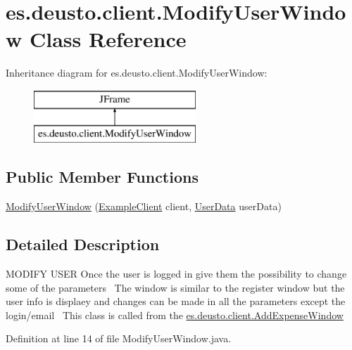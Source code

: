 \hypertarget{classes_1_1deusto_1_1client_1_1_modify_user_window}{}\section{es.\+deusto.\+client.\+Modify\+User\+Window Class Reference}
\label{classes_1_1deusto_1_1client_1_1_modify_user_window}
Inheritance diagram for es.\+deusto.\+client.\+Modify\+User\+Window\+:\begin{figure}[H]
\begin{center}
\leavevmode
\includegraphics[height=2.000000cm]{classes_1_1deusto_1_1client_1_1_modify_user_window}
\end{center}
\end{figure}
\subsection*{Public Member Functions}
\begin{DoxyCompactItemize}
\item 
\hyperlink{classes_1_1deusto_1_1client_1_1_modify_user_window_aa3748a01efbae39f32f99255a13e5d39}{Modify\+User\+Window} (\hyperlink{classes_1_1deusto_1_1client_1_1_example_client}{Example\+Client} client, \hyperlink{classes_1_1deusto_1_1serialization_1_1_user_data}{User\+Data} user\+Data)
\end{DoxyCompactItemize}


\subsection{Detailed Description}
M\+O\+D\+I\+FY U\+S\+ER Once the user is logged in give them the possibility to change some of the parameters~\newline
The window is similar to the register window but the user info is displaey and changes can be made in all the parameters except the login/email~\newline
This class is called from the \hyperlink{classes_1_1deusto_1_1client_1_1_add_expense_window}{es.\+deusto.\+client.\+Add\+Expense\+Window} 

Definition at line 14 of file Modify\+User\+Window.\+java.



